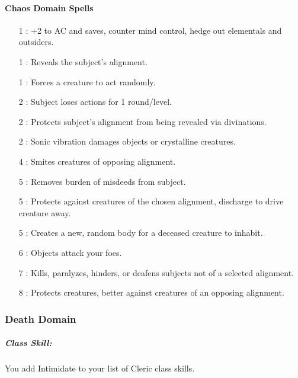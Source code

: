 \paragraph{Chaos Domain Spells}
\begin{itemize}
\item[1] : +2 to AC and saves, counter mind control, hedge out elementals and outsiders.
\item[1] : Reveals the subject's alignment.
\item[1] : Forces a creature to act randomly.
\item[2] : Subject loses actions for 1 round/level.
\item[2] : Protects subject's alignment from being revealed via divinations.
\item[2] : Sonic vibration damages objects or crystalline creatures.
\item[4] : Smites creatures of opposing alignment.
\item[5] : Removes burden of misdeeds from subject.
\item[5] : Protects against creatures of the chosen alignment, discharge to drive creature away.
\item[5] : Creates a new, random body for a deceased creature to inhabit.
\item[6] : Objects attack your foes.
\item[7] : Kills, paralyzes, hinders, or deafens subjects not of a selected alignment.
\item[8] : Protects creatures, better against creatures of an opposing alignment.
\end{itemize}
\subsubsection{Death Domain}
\subparagraph{Class Skill:}
You add Intimidate to your list of Cleric class skills.
